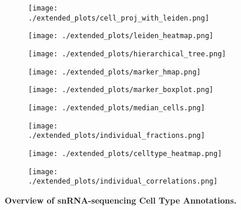 \begin{figure}[H]
    \begin{subfigure}[t]{.2\textwidth}
        \caption{}
        \texttt{[image: ./extended\_plots/cell\_proj\_with\_leiden.png]}        
    \end{subfigure}
    \hspace{0.5cm}  
    \begin{subfigure}[t]{.2\textwidth}
        \caption{}
        \texttt{[image: ./extended\_plots/leiden\_heatmap.png]}        
    \end{subfigure}   
    \hspace{0.5cm}  
    \begin{subfigure}[t]{.2\textwidth}
        \caption{}
        \texttt{[image: ./extended\_plots/hierarchical\_tree.png]}        
    \end{subfigure}  
    \hspace{0.5cm}           
    \begin{subfigure}[t]{.2\textwidth}
        \caption{}
        \texttt{[image: ./extended\_plots/marker\_hmap.png]}        
    \end{subfigure}  
    \begin{subfigure}[t]{.2\textwidth}
        \caption{}
        \texttt{[image: ./extended\_plots/marker\_boxplot.png]}        
    \end{subfigure}    
    \hspace{1cm}
    \begin{subfigure}[t]{.2\textwidth}
        \caption{}
        \texttt{[image: ./extended\_plots/median\_cells.png]}        
    \end{subfigure}  
    \hspace{1cm}
    \begin{subfigure}[t]{.33\textwidth}
        \caption{}
        \texttt{[image: ./extended\_plots/individual\_fractions.png]}        
    \end{subfigure}    
    \par   
    \begin{subfigure}[t]{.25\textwidth}
        \caption{}
        \texttt{[image: ./extended\_plots/celltype\_heatmap.png]}        
    \end{subfigure}    
    \hspace{0.5cm}   
    \begin{subfigure}[t]{.2\textwidth}
        \caption{}
        \texttt{[image: ./extended\_plots/individual\_correlations.png]}        
    \end{subfigure}       
    \caption{
        \textbf{Overview of snRNA-sequencing Cell Type Annotations.}\\
    }
    \label{fig:snRNA_quality_annotation}
\end{figure}
